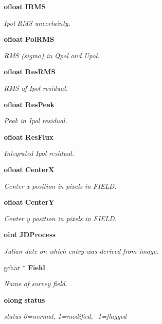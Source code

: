 \begin{CompactItemize}
{\bf ofloat} {\bf IRMS}
\begin{CompactList}\small\item\em Ipol RMS uncertainty. \item\end{CompactList}\item 
{\bf ofloat} {\bf Pol\-RMS}
\begin{CompactList}\small\item\em RMS (sigma) in Qpol and Upol. \item\end{CompactList}\item 
{\bf ofloat} {\bf Res\-RMS}
\begin{CompactList}\small\item\em RMS of Ipol residual. \item\end{CompactList}\item 
{\bf ofloat} {\bf Res\-Peak}
\begin{CompactList}\small\item\em Peak in Ipol residual. \item\end{CompactList}\item 
{\bf ofloat} {\bf Res\-Flux}
\begin{CompactList}\small\item\em Integrated Ipol residual. \item\end{CompactList}\item 
{\bf ofloat} {\bf Center\-X}
\begin{CompactList}\small\item\em Center x position in pixels in FIELD. \item\end{CompactList}\item 
{\bf ofloat} {\bf Center\-Y}
\begin{CompactList}\small\item\em Center y position in pixels in FIELD. \item\end{CompactList}\item 
{\bf oint} {\bf JDProcess}
\begin{CompactList}\small\item\em Julian date on which entry was derived from image. \item\end{CompactList}\item 
gchar $\ast$ {\bf Field}
\begin{CompactList}\small\item\em Name of survey field. \item\end{CompactList}\item 
{\bf olong} {\bf status}
\begin{CompactList}\small\item\em status 0=normal, 1=modified, -1=flagged \item\end{CompactList}\end{CompactItemize}


